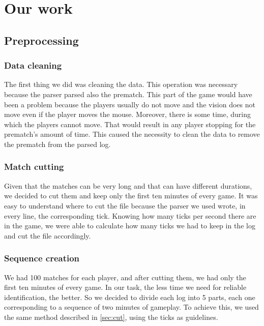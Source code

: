 
\chapter{Our work}
\label{cap:progettazione-codifica}



\section{\label{sec:pre}Preprocessing}

	\subsection{Data cleaning}
		The first thing we did was cleaning the data. 
		This operation was necessary because the parser parsed also the prematch. 
		This part of the game would have been a problem because the players usually do not move and the vision does not move even if the player moves the mouse. 
		Moreover, there is some time, during which the players cannot move.
		That would result in any player stopping for the prematch's amount of time.
		This caused the necessity to clean the data to remove the prematch from the parsed log.
	
	\subsection{\label{sec:cut}Match cutting}
		Given that the matches can be very long and that can have different durations, we decided to cut them and keep only the first ten minutes of every game. 
		It was easy to understand where to cut the file because the parser we used wrote, in every line, the corresponding \gls{tick}. 
		Knowing how many ticks per second there are in the game, we were able to calculate how many ticks we had to keep in the log and cut the file accordingly.
		
	\subsection{Sequence creation}
		We had 100 matches for each player, and after cutting them, we had only the first ten minutes of every game. 
		In our task, the less time we need for reliable identification, the better. 
		So we decided to divide each log into 5 parts, each one corresponding to a sequence of two minutes of gameplay. 
		To achieve this, we used the same method described in \ref{sec:cut}, using the ticks as guidelines. 
		
